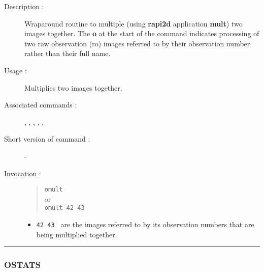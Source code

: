 \begin{description}

\item[Description :] Wraparound routine to multiple (using {\bf rapi2d}
application {\bf mult}) two images together. The {\bf o} at the start of the
command indicates processing of two raw observation ({\sc ro}) images
referred to by their observation number rather than their full name.

\item[Usage :] Multiplies two images together.

\item[Associated commands :] {\tt {}}, 
{\tt {}}, {\tt {}}, 
{\tt {}}, {\tt {}}, {\tt {}}

\item[Short version of command :] -
\item[Invocation :]

\begin{quote}{\tt  omult }\\
or \\
{\tt omult 42 43 }
\end{quote}

\begin{itemize}

\item {\tt 42 43 } are the images referred to by its observation numbers
 that  are being multiplied together.
\end{itemize}

\end{description}

\hrule 
\subsubsection*{\label{OSTATS}OSTATS}

